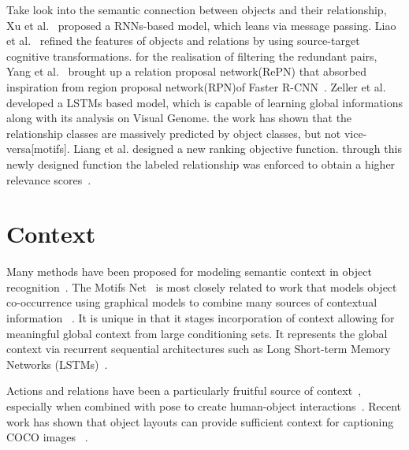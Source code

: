 Take look into the semantic connection between objects and their relationship, Xu et al.~\cite{xu2017scene} proposed a RNNs-based model,  which leans via message passing. Liao et al.~\cite{liao2019exploring} refined the features of objects and relations by using source-target cognitive transformations. for the realisation of filtering the redundant pairs, Yang et al.~\cite{yang2018graph} brought up a relation proposal network(RePN) that absorbed inspiration from region proposal network(RPN)of Faster R-CNN~\cite{ren2016faster}. Zeller et al.~\cite{zellers2018neural} developed a LSTMs based model, which is capable of learning global informations along with its analysis on Visual Genome. the work has shown that the relationship classes are massively predicted by object classes, but not vice-versa[motifs]. Liang et al. designed a new ranking objective function. through this newly designed function the labeled relationship was enforced to obtain a higher relevance scores~\cite{liang2018visual}.

\section{Context}
Many methods have been proposed for modeling semantic context in object recognition~\cite{divvala2009empirical}. The Motifs Net~\cite{zellers2018neural} is most closely related to work that models object co-occurrence using graphical models to combine many sources of contextual information ~\cite{rabinovich2007objects,belongie2007context}. It is unique in that it stages incorporation of context allowing for meaningful global context from large conditioning sets. It represents the global context via recurrent sequential architectures such as Long Short-term Memory Networks (LSTMs)~\cite{hochreiter1997long}.

Actions and relations have been a particularly fruitful source of context~\cite{marszalek2009actions,gupta2015visual}, especially when combined with pose to create human-object interactions~\cite{yao2010modeling}. Recent work has shown that object layouts can provide sufficient context for captioning COCO images ~\cite{lin2014microsoft}.